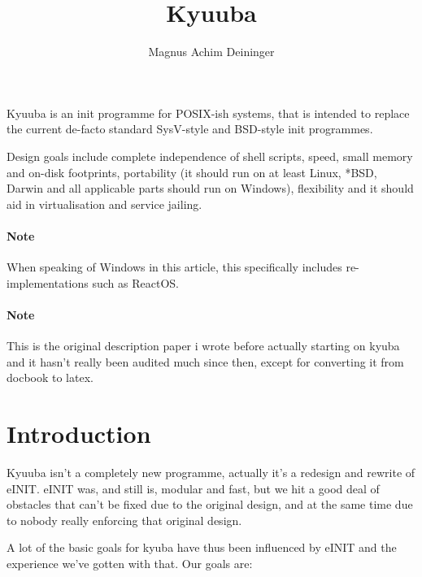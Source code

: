 \documentclass[a4paper,twoside,titlepage]{article}
\title{Kyuuba}
\author{Magnus Achim Deininger}
\begin{document}
Kyuuba is an init programme for POSIX-ish systems, that is intended to replace
the current de-facto standard SysV-style and BSD-style init programmes.

Design goals include complete independence of shell scripts, speed, small memory
and on-disk footprints, portability (it should run on at least Linux, *BSD,
Darwin and all applicable parts should run on Windows), flexibility and it
should aid in virtualisation and service jailing.

\paragraph{Note}
When speaking of Windows in this article, this specifically includes
re-implementations such as ReactOS.

\paragraph{Note}
This is the original description paper i wrote before actually starting on kyuba
and it hasn't really been audited much since then, except for converting it from
docbook to latex.

\section*{Introduction}
Kyuuba isn't a completely new programme, actually it's a redesign and rewrite of
eINIT. eINIT was, and still is, modular and fast, but we hit a good deal of
obstacles that can't be fixed due to the original design, and at the same time
due to nobody really enforcing that original design.

A lot of the basic goals for kyuba have thus been influenced by eINIT and the
experience we've gotten with that. Our goals are:
\end{document}
